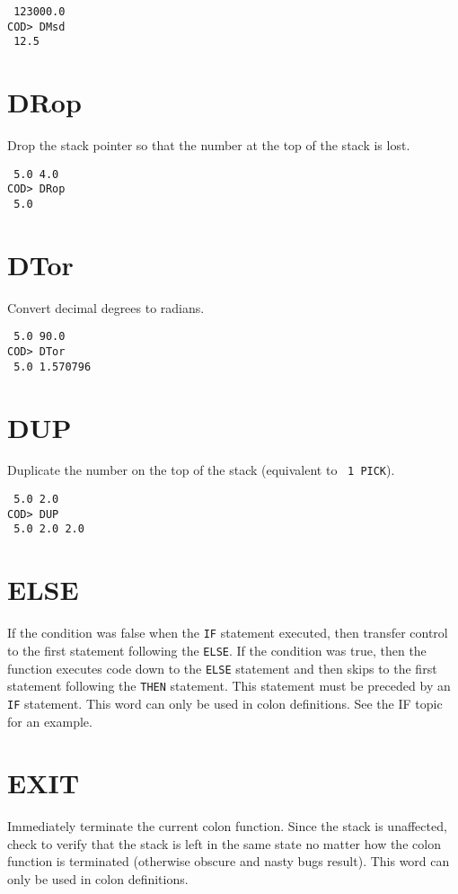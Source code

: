 \medskip
{}
\begin{verbatim}
 123000.0
COD> DMsd
 12.5
\end{verbatim}

\section*{DRop}
Drop the stack pointer so that the number at the top of the stack is lost.

\medskip
{}
\begin{verbatim}
 5.0 4.0
COD> DRop
 5.0
\end{verbatim}

\section*{DTor}
Convert decimal degrees to radians.

\medskip
{}
\begin{verbatim}
 5.0 90.0
COD> DTor
 5.0 1.570796
\end{verbatim}

\section*{DUP}
Duplicate the number on the top of the stack
(equivalent to \, {\tt 1~PICK}).

\medskip
{}
\begin{verbatim}
 5.0 2.0
COD> DUP
 5.0 2.0 2.0
\end{verbatim}

\section*{ELSE}
If the condition was false when the {\tt IF} statement executed,
then transfer control to the first statement following the {\tt ELSE}.
If the condition was true,
then the function executes code down to the {\tt ELSE} statement
and then skips to the first statement following the {\tt THEN} statement.
This statement must be preceded by an {\tt IF} statement.
This word can only be used in colon definitions.
See the IF topic for an example.

\section*{EXIT}
Immediately terminate the current colon function.
Since the stack is unaffected,
check to verify that the stack is left in the same state
no matter how the colon function is terminated
(otherwise obscure and nasty bugs result).
This word can only be used in colon definitions.

